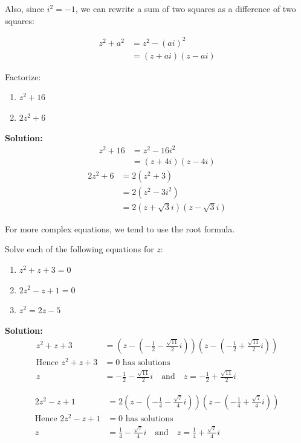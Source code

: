 \documentclass[
	12pt, %
	fleqn, %
	a4paper, %
]{LegrandOrangeBook}
\begin{document}
Also, since $i^2 = -1$, we can rewrite a sum of two squares as a difference of two squares:
\begin{corollary}
    $$\begin{aligned}
        z^{2}+a^{2}& =z^2-(ai)^2  \\
        &=(z+ai)(z-ai)
        \end{aligned}$$
\end{corollary}
\begin{example}
    Factorize:
    \begin{enumerate}
        \item $z^2+16$
        \item $2z^2+6$
    \end{enumerate}
\end{example}
\textbf{Solution:}
$$ \begin{aligned}
        z^2 + 16 &= z^2 - 16i^2 \\
                 &= (z + 4i)(z - 4i)
    \end{aligned}$$
$$\begin{aligned}
        2z^2 + 6 &= 2(z^2 + 3) \\
                 &= 2(z^2 - 3i^2) \\
                 &= 2(z + \sqrt{3}i)(z - \sqrt{3}i)
    \end{aligned}$$

For more complex equations, we tend to use the root formula.
\begin{example}
    Solve each of the following equations for \( z \):
    \begin{enumerate}
        \item \( z^2 + z + 3 = 0 \)
        \item \( 2z^2 - z + 1 = 0 \)
        \item \( z^2 = 2z - 5 \)
    \end{enumerate}
\end{example}
\textbf{Solution:}
$$\begin{aligned}
    z^2 + z + 3 &= \left(z - \left(-\frac{1}{2} - \frac{\sqrt{11}}{2}i\right)\right)\left(z - \left(-\frac{1}{2} + \frac{\sqrt{11}}{2}i\right)\right) \\
    \text{Hence } z^2 + z + 3 &= 0 \text{ has solutions} \\
    z &= -\frac{1}{2} - \frac{\sqrt{11}}{2}i \quad \text{and} \quad z = -\frac{1}{2} + \frac{\sqrt{11}}{2}i
\end{aligned}$$

$$\begin{aligned}
    2z^2 - z + 1 &= 2\left(z - \left(-\frac{1}{4} - \frac{\sqrt{7}}{4}i\right)\right)\left(z - \left(-\frac{1}{4} + \frac{\sqrt{7}}{4}i\right)\right) \\
    \text{Hence } 2z^2 - z + 1 &= 0 \text{ has solutions} \\
    z &= \frac{1}{4} - \frac{\sqrt{7}}{4}i \quad \text{and} \quad z = \frac{1}{4} + \frac{\sqrt{7}}{4}i
\end{aligned}$$
\end{document}
